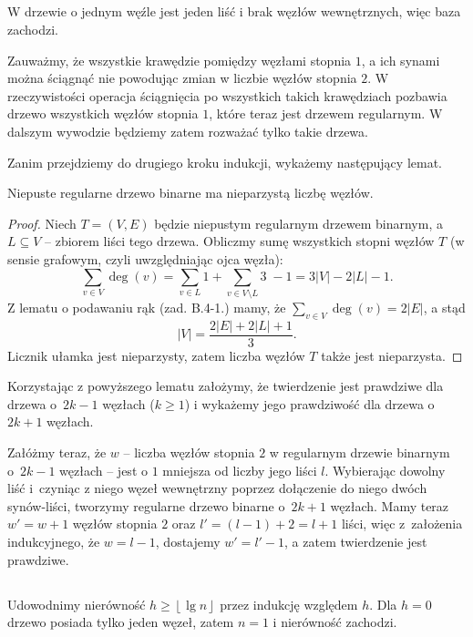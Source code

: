 \subsection{} %
W drzewie o jednym węźle jest jeden liść i brak węzłów wewnętrznych, więc baza zachodzi.

Zauważmy, że wszystkie krawędzie pomiędzy węzłami stopnia $1$, a ich synami można ściągnąć nie powodując zmian w liczbie węzłów stopnia $2$. W rzeczywistości operacja ściągnięcia po wszystkich takich krawędziach pozbawia drzewo wszystkich węzłów stopnia $1$, które teraz jest drzewem regularnym. W dalszym wywodzie będziemy zatem rozważać tylko takie drzewa.

Zanim przejdziemy do drugiego kroku indukcji, wykażemy następujący lemat.
\begin{lemat*}
	Niepuste regularne drzewo binarne ma nieparzystą liczbę węzłów.
\end{lemat*}
\begin{proof}
Niech $T=(V,E)$ będzie niepustym regularnym drzewem binarnym, a~$L\subseteq V$ -- zbiorem liści tego drzewa. Obliczmy sumę wszystkich stopni węzłów $T$ (w sensie grafowym, czyli uwzględniając ojca węzła):
\[
	\sum_{v\in V}\deg(v) = \sum_{v\in L}1+\sum_{v\in V\setminus L}3\;-1=3|V|-2|L|-1.
\]
Z lematu o podawaniu rąk (zad. B.4-1.) mamy, że $\sum_{v\in V}\deg(v) = 2|E|$, a stąd
\[
	|V| = \frac{2|E|+2|L|+1}{3}.
\]
Licznik ułamka jest nieparzysty, zatem liczba węzłów $T$ także jest nieparzysta.

\end{proof}

Korzystając z powyższego lematu założymy, że twierdzenie jest prawdziwe dla drzewa o~$2k-1$ węzłach ($k\ge 1$) i wykażemy jego prawdziwość dla drzewa o $2k+1$ węzłach.

Załóżmy teraz, że $w$ -- liczba węzłów stopnia $2$ w regularnym drzewie binarnym o~$2k-1$ węzłach -- jest o $1$ mniejsza od liczby jego liści $l$. Wybierając dowolny liść i~czyniąc z niego węzeł wewnętrzny poprzez dołączenie do niego dwóch synów-liści, tworzymy regularne drzewo binarne o~$2k+1$ węzłach. Mamy teraz $w'=w+1$ węzłów stopnia $2$ oraz $l'=(l-1)+2=l+1$ liści, więc z~założenia indukcyjnego, że $w=l-1$, dostajemy $w'=l'-1$, a zatem twierdzenie jest prawdziwe.

\subsection{} %
Udowodnimy nierówność $h\ge\left\lfloor\lg n\right\rfloor$ przez indukcję względem $h$. Dla $h=0$ drzewo posiada tylko jeden węzeł, zatem $n=1$ i nierówność zachodzi.

